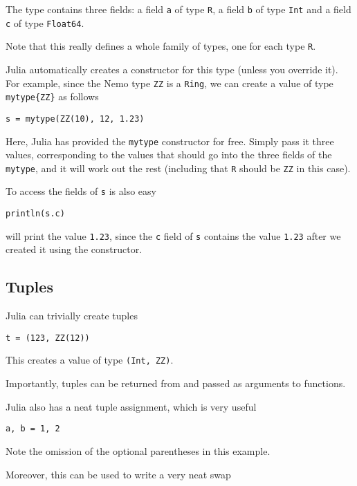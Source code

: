 \documentclass[a4paper,10pt]{article}
\newcommand{\code}{\lstinline}
\begin{document}
{The type contains three fields: a field \code{a} of type \code{R}, a field \code{b} of
type \code{Int} and a field \code{c} of type \code{Float64}.

Note that this really defines a whole family of types, one for each type \code{R}.

Julia automatically creates a constructor for this type (unless you override it). For
example, since the Nemo type \code{ZZ} is a \code{Ring}, we can create a value of
type \code|mytype{ZZ}| as follows

\begin{lstlisting}
s = mytype(ZZ(10), 12, 1.23)
\end{lstlisting}

Here, Julia has provided the \code{mytype} constructor for free. Simply pass it three
values, corresponding to the values that should go into the three fields of the 
\code{mytype}, and it will work out the rest (including that \code{R} should be
\code{ZZ} in this case).

To access the fields of \code{s} is also easy

\begin{lstlisting}
println(s.c)
\end{lstlisting}

will print the value \code{1.23}, since the \code{c} field of \code{s} contains the
value \code{1.23} after we created it using the constructor.

\subsection{Tuples}

Julia can trivially create tuples

\begin{lstlisting}
t = (123, ZZ(12))
\end{lstlisting}

This creates a value of type \code{(Int, ZZ)}.

Importantly, tuples can be returned from and passed as arguments to functions.

Julia also has a neat tuple assignment, which is very useful

\begin{lstlisting}
a, b = 1, 2
\end{lstlisting}

Note the omission of the optional parentheses in this example.

Moreover, this can be used to write a very neat swap

}
\end{document}
